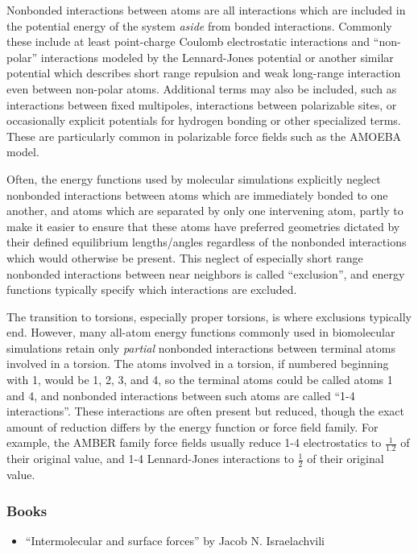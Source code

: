 \documentclass[9pt,bestpractices]{livecoms}
\begin{document}
Nonbonded interactions between atoms are all interactions which are included in the potential energy of the system \emph{aside} from bonded interactions.  
Commonly these include at least point-charge Coulomb electrostatic interactions and ``non-polar'' interactions modeled by the Lennard-Jones potential or another similar potential which describes short range repulsion and weak long-range interaction even between non-polar atoms.
Additional terms may also be included, such as interactions between fixed multipoles, interactions between polarizable sites, or occasionally explicit potentials for hydrogen bonding or other specialized terms.
These are particularly common in polarizable force fields such as the AMOEBA model.

Often, the energy functions used by molecular simulations explicitly neglect nonbonded interactions between atoms which are immediately bonded to one
another, and atoms which are separated by only one intervening atom, partly to make it easier to ensure that these atoms have preferred geometries dictated by their defined equilibrium lengths/angles regardless of the nonbonded interactions which would otherwise be present.
This neglect of especially short range nonbonded interactions between near neighbors is called ``exclusion'', and energy functions typically specify which interactions are excluded.

The transition to torsions, especially proper torsions, is where exclusions
typically end.
However, many all-atom energy functions commonly used in biomolecular simulations retain only \emph{partial} nonbonded interactions between terminal atoms involved in a torsion. 
The atoms involved in a torsion, if numbered beginning with 1, would be 1, 2, 3, and 4, so the terminal atoms could be called atoms 1 and 4, and nonbonded interactions between such atoms are called ``1-4 interactions''. 
These interactions are often present but reduced, though the exact amount of reduction differs by the energy function or force field family.
For example, the AMBER family force fields usually reduce 1-4 electrostatics to $\frac{1}{1.2}$ of their original value, and 1-4 Lennard-Jones interactions to $\frac{1}{2}$ of their original value.


\subsubsection{Books}
\begin{itemize}
\item ``Intermolecular and surface forces'' by Jacob N. Israelachvili
\end{itemize}
\end{document}
